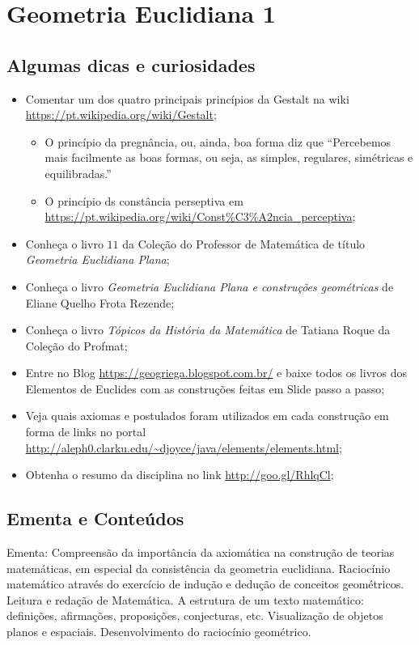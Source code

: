 
\chapter{Geometria Euclidiana 1}

\section*{Algumas dicas e curiosidades}
\begin{itemize}
    \item Comentar um dos quatro principais princípios da Gestalt na wiki \url{https://pt.wikipedia.org/wiki/Gestalt};
    \begin{itemize}
    \item O princípio da pregnância, ou, ainda, boa forma diz que ``Percebemos mais facilmente as boas formas, ou seja, as simples, regulares, simétricas e equilibradas.''
    \item O princípio ds constância perseptiva em \url{https://pt.wikipedia.org/wiki/Const\%C3\%A2ncia_perceptiva};
    \end{itemize}
    
\item Conheça o livro $11$ da Coleção do Professor de Matemática de título \textit{Geometria Euclidiana Plana};
\item Conheça o livro \textit{Geometria Euclidiana Plana e construções geométricas} de Eliane Quelho Frota Rezende;
\item Conheça o livro \textit{Tópicos da História da Matemática} de Tatiana Roque da Coleção do Profmat;
\item Entre no Blog \url{https://geogriega.blogspot.com.br/} e baixe todos os livros dos Elementos de Euclides com as construções feitas em Slide passo a passo;
\item Veja quais axiomas e postulados foram utilizados em cada construção em forma de links no portal \url{http://aleph0.clarku.edu/~djoyce/java/elements/elements.html};
\item Obtenha o resumo da disciplina no link \url{http://goo.gl/RhlqCl};
\end{itemize}

\section{Ementa e Conteúdos}
Ementa: Compreensão da importância da axiomática na construção de teorias matemáticas, em especial da consistência da geometria euclidiana. Raciocínio matemático através do exercício de indução e dedução de conceitos geométricos. Leitura e redação de Matemática. A estrutura de um texto matemático: definições, afirmações, proposições, conjecturas, etc. Visualização de objetos planos e espaciais. Desenvolvimento do raciocínio geométrico. 

